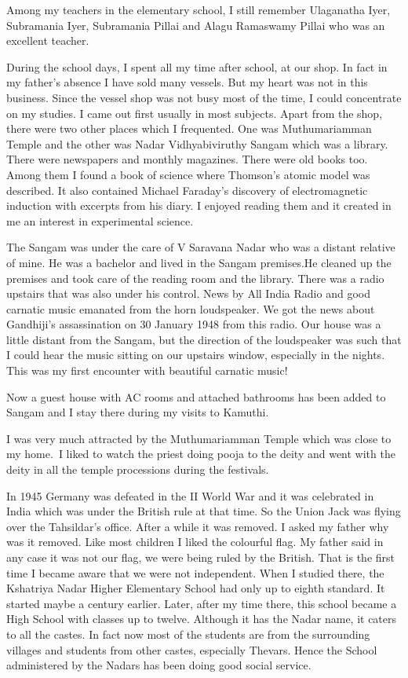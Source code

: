 Among my teachers in the elementary school, I still remember Ulaganatha
Iyer, Subramania Iyer, Subramania Pillai and Ala\-gu Ramaswamy Pillai who
was an excellent teacher.

During the school days, I spent all my time after school, at our shop. 
In fact in my father's absence I have sold many vessels. But my heart was 
not in this business. Since the vessel shop was not busy most of the 
time, I could concentrate on my studies. I came out first usually in 
most subjects.
\vskip 1pt
Apart from the shop, there were two other places which I frequen\-ted. One 
was Muthumariamman Temple and the other was Nadar Vidhyabiviruthy Sangam 
which was a library. There were newspapers and monthly magazines. There 
were old books too. Among them I found a book of science where Thomson's 
atomic model was described. It also contained Michael Faraday's 
discovery of electromagnetic induction with excerpts from his diary. I 
enjoyed reading them and it created in me an interest in experimental science.

The Sangam was under the care of V Saravana Nadar who was a distant 
relative of mine. He was a bachelor and lived in the Sangam premises.He 
cleaned up the premises and took care of the reading room and the 
library. There was a radio upstairs that was also under his control. 
News by All India Radio and good carnatic music emanated from the horn 
loudspeaker. We got the news about Gandhiji's assassination on 30 
January 1948 from this radio. Our house was a little distant from the 
Sangam, but the direction of the loudspeaker was such that I could hear 
the music sitting on our upstairs window, especially in the nights. 
This was my first encounter with beautiful carnatic music!

Now a guest house with AC rooms and attached bathrooms has been added to 
Sangam and I stay there during my visits to Kamuthi.


I was very much attracted by the Muthumariamman Temple which was close 
to my home.\ I liked to watch the priest doing pooja to the deity and 
went with the deity in all the temple processions during the festivals.
  
In 1945 Germany was defeated in the II World War and it was celebrated 
in India which was under the British rule at that time. So the Union 
Jack was flying over the Tahsildar's office. After a while it was 
removed. I asked my father why was it removed. Like most children I 
liked the colourful flag. My father said in any case it was not our 
flag, we were being ruled by the British. That is the first time I 
became aware that we were not independent.
\vskip 1pt
When I studied there, the Kshatriya Nadar Higher Elementary School had 
only up to eighth standard. It started maybe a century earlier. Later, 
after my time there, this school became a High School with classes up to 
twelve. Although it has the Nadar name, it caters to all the castes. 
In fact now most of the students are from the surrounding villages and 
students from other castes, especially Thevars. Hence 
the School administered by the Nadars has been doing good social 
service.

